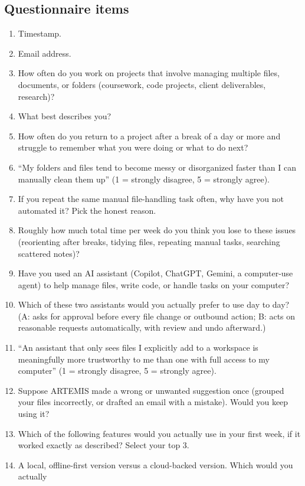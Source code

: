 \documentclass[11pt]{article}
\begin{document}
\subsection{Questionnaire items}
\begin{enumerate}
  \item Timestamp.
  \item Email address.
  \item How often do you work on projects that involve managing multiple files, documents, or
        folders (coursework, code projects, client deliverables, research)?
  \item What best describes you?
  \item How often do you return to a project after a break of a day or more and struggle to
        remember what you were doing or what to do next?
  \item \enquote{My folders and files tend to become messy or disorganized faster than I can
        manually clean them up} (1 = strongly disagree, 5 = strongly agree).
  \item If you repeat the same manual file-handling task often, why have you not automated it?
        Pick the honest reason.
  \item Roughly how much total time per week do you think you lose to these issues (reorienting
        after breaks, tidying files, repeating manual tasks, searching scattered notes)?
  \item Have you used an AI assistant (Copilot, ChatGPT, Gemini, a computer-use agent) to help
        manage files, write code, or handle tasks on your computer?
  \item Which of these two assistants would you actually prefer to use day to day? (A: asks for
        approval before every file change or outbound action; B: acts on reasonable requests
        automatically, with review and undo afterward.)
  \item \enquote{An assistant that only sees files I explicitly add to a workspace is
        meaningfully more trustworthy to me than one with full access to my computer}
        (1 = strongly disagree, 5 = strongly agree).
  \item Suppose ARTEMIS made a wrong or unwanted suggestion once (grouped your files
        incorrectly, or drafted an email with a mistake). Would you keep using it?
  \item Which of the following features would you actually use in your first week, if it worked
        exactly as described? Select your top 3.
  \item A local, offline-first version versus a cloud-backed version. Which would you actually

\end{enumerate}
\end{document}
